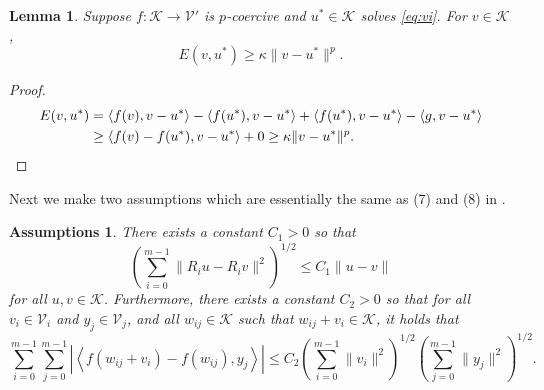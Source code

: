 \documentclass[letterpaper,final,12pt,reqno]{amsart}
\theoremstyle{cstyle}
\newtheorem{lemma}[theorem]{Lemma}
\theoremstyle{cstyle*}
\newtheorem{assumptions*}{Assumptions}
\theoremstyle{dstyle}
\numberwithin{equation}{section}
\numberwithin{figure}{section}
\numberwithin{table}{section}
\numberwithin{theorem}{section}
\newcommand{\cK}{\mathcal{K}}
\newcommand{\cV}{\mathcal{V}}
\newcommand{\ip}[2]{\left<#1,#2\right>}
\begin{document}
\begin{lemma} \label{lem:normlike}  Suppose $f:\mathcal{K} \to \mathcal{V}'$ is $p$-coercive and $u^* \in \mathcal{K}$ solves \eqref{eq:vi}.  For $v \in \mathcal{K}$,
\begin{equation}
  E(v,u^*) \ge \kappa \|v-u^*\|^p.  \label{eq:normlikebound}
\end{equation}
\end{lemma}

\begin{proof}
\begin{align*}
E(v,u^*) &= \ip{f(v)}{v-u^*} - \ip{f(u^*)}{v-u^*} + \ip{f(u^*)}{v-u^*} - \ip{g}{v-u^*} \\
   &\ge \ip{f(v)-f(u^*)}{v-u^*} + 0 \ge \kappa \|v-u^*\|^p.  \qedhere
\end{align*}
\end{proof}

Next we make two assumptions which are essentially the same as (7) and (8) in \cite{Tai2003}.

\begin{assumptions*}  There exists a constant $C_1>0$ so that
\begin{equation}
\left(\sum_{i=0}^{m-1} \|R_i u - R_i v\|^2\right)^{1/2} \le C_1 \|u-v\| \label{as:lipschitzrestrictions}
\end{equation}
for all $u,v\in\cK$.  Furthermore, there exists a constant $C_2>0$ so that for all $v_i \in \cV_i$ and $y_j \in \cV_j$, and all $w_{ij} \in \cK$ such that $w_{ij} + v_i \in \cK$, it holds that
\begin{equation}
\sum_{i=0}^{m-1} \sum_{j=0}^{m-1} \left|\ip{f(w_{ij} + v_i) - f(w_{ij})}{y_j}\right| \le C_2 \left(\sum_{i=0}^{m-1} \|v_i\|^2\right)^{1/2} \left(\sum_{j=0}^{m-1} \|y_j\|^2\right)^{1/2}. \label{as:lipschitzresidual}
\end{equation}
\end{assumptions*}
\end{document}
